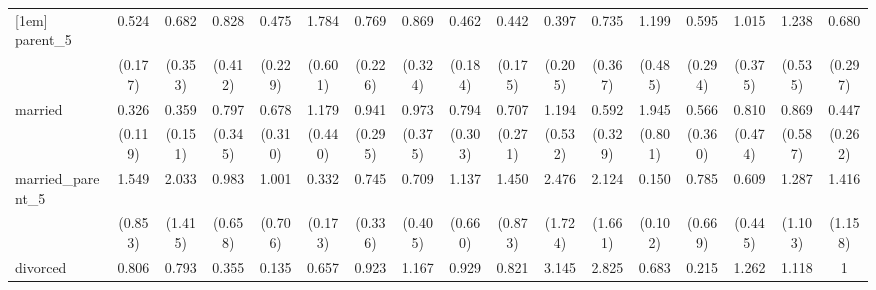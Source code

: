 {\begin{tabular}{l*{16}{c}}
[1em]
parent\_5            &       0.524         &       0.682         &       0.828         &       0.475         &       1.784         &       0.769         &       0.869         &       0.462         &       0.442\sym{*}  &       0.397         &       0.735         &       1.199         &       0.595         &       1.015         &       1.238         &       0.680         \\
                    &     (0.177)         &     (0.353)         &     (0.412)         &     (0.229)         &     (0.601)         &     (0.226)         &     (0.324)         &     (0.184)         &     (0.175)         &     (0.205)         &     (0.367)         &     (0.485)         &     (0.294)         &     (0.375)         &     (0.535)         &     (0.297)         \\
[1em]
married             &       0.326\sym{**} &       0.359\sym{*}  &       0.797         &       0.678         &       1.179         &       0.941         &       0.973         &       0.794         &       0.707         &       1.194         &       0.592         &       1.945         &       0.566         &       0.810         &       0.869         &       0.447         \\
                    &     (0.119)         &     (0.151)         &     (0.345)         &     (0.310)         &     (0.440)         &     (0.295)         &     (0.375)         &     (0.303)         &     (0.271)         &     (0.532)         &     (0.329)         &     (0.801)         &     (0.360)         &     (0.474)         &     (0.587)         &     (0.262)         \\
[1em]
married\_parent\_5    &       1.549         &       2.033         &       0.983         &       1.001         &       0.332\sym{*}  &       0.745         &       0.709         &       1.137         &       1.450         &       2.476         &       2.124         &       0.150\sym{**} &       0.785         &       0.609         &       1.287         &       1.416         \\
                    &     (0.853)         &     (1.415)         &     (0.658)         &     (0.706)         &     (0.173)         &     (0.336)         &     (0.405)         &     (0.660)         &     (0.873)         &     (1.724)         &     (1.661)         &     (0.102)         &     (0.669)         &     (0.445)         &     (1.103)         &     (1.158)         \\
[1em]
divorced            &       0.806         &       0.793         &       0.355         &       0.135         &       0.657         &       0.923         &       1.167         &       0.929         &       0.821         &       3.145         &       2.825         &       0.683         &       0.215         &       1.262         &       1.118         &           1         \\

\end{tabular}}
